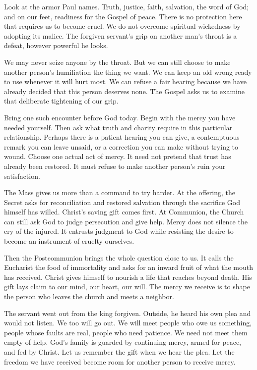 Look at the armor Paul names. Truth, justice, faith, salvation, the
word of God; and on our feet, readiness for the Gospel of peace.
There is no protection here that requires us to become cruel. We do
not overcome spiritual wickedness by adopting its malice. The forgiven
servant's grip on another man's throat is a defeat, however powerful
he looks.

We may never seize anyone by the throat. But we can still choose to
make another person's humiliation the thing we want. We can keep an
old wrong ready to use whenever it will hurt most. We can refuse a
fair hearing because we have already decided that this person deserves
none. The Gospel asks us to examine that deliberate tightening of
our grip.

Bring one such encounter before God today. Begin with the mercy you
have needed yourself. Then ask what truth and charity require in this
particular relationship. Perhaps there is a patient hearing you can
give, a contemptuous remark you can leave unsaid, or a correction you
can make without trying to wound. Choose one actual act of mercy.
It need not pretend that trust has already been restored. It must
refuse to make another person's ruin your satisfaction.

The Mass gives us more than a command to try harder. At the offering,
the Secret asks for reconciliation and restored salvation through the
sacrifice God himself has willed. Christ's saving gift comes first.
At Communion, the Church can still ask God to judge persecution and
give help. Mercy does not silence the cry of the injured. It entrusts
judgment to God while resisting the desire to become an instrument
of cruelty ourselves.

Then the Postcommunion brings the whole question close to us. It
calls the Eucharist the food of immortality and asks for an inward
fruit of what the mouth has received. Christ gives himself to nourish
a life that reaches beyond death. His gift lays claim to our mind,
our heart, our will. The mercy we receive is to shape the person
who leaves the church and meets a neighbor.

The servant went out from the king forgiven. Outside, he heard his
own plea and would not listen. We too will go out. We will meet
people who owe us something, people whose faults are real, people
who need patience. We need not meet them empty of help. God's family
is guarded by continuing mercy, armed for peace, and fed by Christ.
Let us remember the gift when we hear the plea. Let the freedom
we have received become room for another person to receive mercy.
